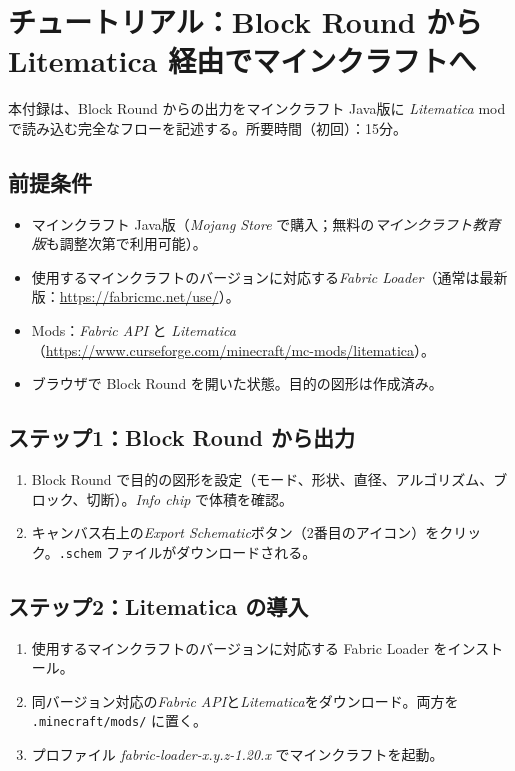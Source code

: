 \documentclass[12pt,a4paper]{scrartcl}
\begin{document}
\newpage
\section{チュートリアル：Block Round から Litematica 経由でマインクラフトへ}\label{ap:litematica}

本付録は、Block Round からの出力をマインクラフト Java版に \emph{Litematica} mod で読み込む完全なフローを記述する。所要時間（初回）：15分。

\subsection{前提条件}
\begin{itemize}[leftmargin=1.3em,itemsep=0.1em,topsep=0.2em,nosep]
  \item マインクラフト Java版（\emph{Mojang Store} で購入；無料の\emph{マインクラフト教育版}も調整次第で利用可能）。
  \item 使用するマインクラフトのバージョンに対応する\emph{Fabric Loader}（通常は最新版：\url{https://fabricmc.net/use/}）。
  \item Mods：\emph{Fabric API} と \emph{Litematica}（\url{https://www.curseforge.com/minecraft/mc-mods/litematica}）。
  \item ブラウザで Block Round を開いた状態。目的の図形は作成済み。
\end{itemize}

\subsection{ステップ1：Block Round から出力}
\begin{enumerate}[leftmargin=1.5em,itemsep=0.15em,topsep=0.3em]
  \item Block Round で目的の図形を設定（モード、形状、直径、アルゴリズム、ブロック、切断）。\emph{Info chip} で体積を確認。
  \item キャンバス右上の\emph{Export Schematic}ボタン（2番目のアイコン）をクリック。\texttt{.schem} ファイルがダウンロードされる。
\end{enumerate}

\subsection{ステップ2：Litematica の導入}
\begin{enumerate}[leftmargin=1.5em,itemsep=0.15em,topsep=0.3em]
  \item 使用するマインクラフトのバージョンに対応する Fabric Loader をインストール。
  \item 同バージョン対応の\emph{Fabric API}と\emph{Litematica}をダウンロード。両方を \texttt{.minecraft/mods/} に置く。
  \item プロファイル \emph{fabric-loader-x.y.z-1.20.x} でマインクラフトを起動。
\end{enumerate}
\end{document}
